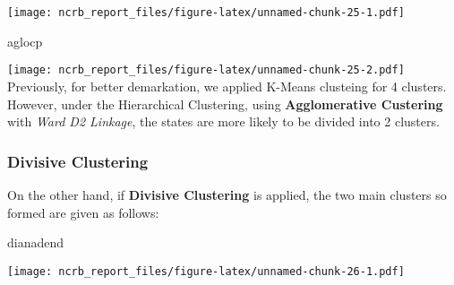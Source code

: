 \documentclass[
  12,
  a4paper,
]{report}
\newenvironment{Shaded}{\begin{snugshade}}{\end{snugshade}}
\newcommand{\NormalTok}[1]{#1}
\begin{document}
\texttt{[image: ncrb\_report\_files/figure-latex/unnamed-chunk-25-1.pdf]}

\begin{Shaded}
\begin{Highlighting}[]
\NormalTok{aglocp}
\end{Highlighting}
\end{Shaded}

\texttt{[image: ncrb\_report\_files/figure-latex/unnamed-chunk-25-2.pdf]}
Previously, for better demarkation, we applied K-Means clusteing for 4
clusters. However, under the Hierarchical Clustering, using
\textbf{Agglomerative Custering} with \emph{Ward D2 Linkage}, the states
are more likely to be divided into 2 clusters.

\hypertarget{divisive-clustering}{%
\subsubsection{Divisive Clustering}\label{divisive-clustering}}

On the other hand, if \textbf{Divisive Clustering} is applied, the two
main clusters so formed are given as follows:

\begin{Shaded}
\begin{Highlighting}[]
\NormalTok{dianadend}
\end{Highlighting}
\end{Shaded}

\texttt{[image: ncrb\_report\_files/figure-latex/unnamed-chunk-26-1.pdf]}
\end{document}
